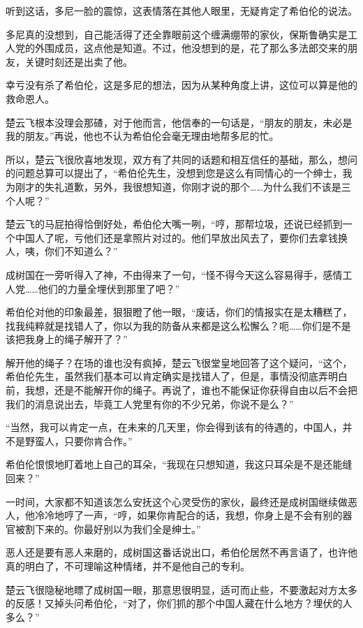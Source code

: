 听到这话，多尼一脸的震惊，这表情落在其他人眼里，无疑肯定了希伯伦的说法。

多尼真的没想到，自己能活得了还全靠眼前这个缠满绷带的家伙，保斯鲁确实是工人党的外围成员，这点他是知道。不过，他没想到的是，花了那么多法郎交来的朋友，关键时刻还是出卖了他。

幸亏没有杀了希伯伦，这是多尼的想法，因为从某种角度上讲，这位可以算是他的救命恩人。

楚云飞根本没理会那碴，对于他而言，他信奉的一句话是，“朋友的朋友，未必是我的朋友。”再说，他也不认为希伯伦会毫无理由地帮多尼的忙。

所以，楚云飞很欣喜地发现，双方有了共同的话题和相互信任的基础，那么，想问的问题总算可以提出了，“希伯伦先生，没想到您是这么有同情心的一个绅士，我为刚才的失礼道歉，另外，我很想知道，你刚才说的那个……为什么我们不该是三个人呢？”

楚云飞的马屁拍得恰倒好处，希伯伦大嘴一咧，“哼，那帮垃圾，还说已经抓到一个中国人了呢，亏他们还是拿照片对过的。他们早放出风去了，要你们去拿钱换人，咦，你们不知道么？”

成树国在一旁听得入了神，不由得来了一句，“怪不得今天这么容易得手，感情工人党……他们的力量全埋伏到那里了吧？”

希伯伦对他的印象最差，狠狠瞪了他一眼，“废话，你们的情报实在是太糟糕了，找我纯粹就是找错人了，你以为我的防备从来都是这么松懈么？呃……你们是不是该把我身上的绳子解开了？”

解开他的绳子？在场的谁也没有疯掉，楚云飞很堂皇地回答了这个疑问，“这个，希伯伦先生，虽然我们基本可以肯定确实是找错人了，但是，事情没彻底弄明白前，我想，还是不能解开你的绳子。再说了，谁也不能保证你获得自由以后不会把我们的消息说出去，毕竟工人党里有你的不少兄弟，你说不是么？”

“当然，我可以肯定一点，在未来的几天里，你会得到该有的待遇的，中国人，并不是野蛮人，只要你肯合作。”

希伯伦恨恨地盯着地上自己的耳朵，“我现在只想知道，我这只耳朵是不是还能缝回来？”

一时间，大家都不知道该怎么安抚这个心灵受伤的家伙，最终还是成树国继续做恶人，他冷冷地哼了一声，“哼，如果你肯配合的话，我想，你身上是不会有别的器官被割下来的。你最好别以为我们全是绅士。”

恶人还是要有恶人来磨的，成树国这番话说出口，希伯伦居然不再言语了，也许他真的明白了，不可理喻这种情绪，并不是他自己的专利。

楚云飞很隐秘地瞟了成树国一眼，那意思很明显，适可而止些，不要激起对方太多的反感！又掉头问希伯伦，“对了，你们抓的那个中国人藏在什么地方？埋伏的人多么？”

